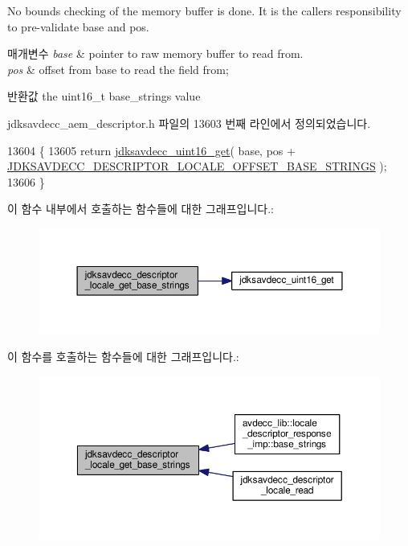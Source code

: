 No bounds checking of the memory buffer is done. It is the caller\textquotesingle{}s responsibility to pre-\/validate base and pos.


\begin{DoxyParams}{매개변수}
{\em base} & pointer to raw memory buffer to read from. \\
\hline
{\em pos} & offset from base to read the field from; \\
\hline
\end{DoxyParams}
\begin{DoxyReturn}{반환값}
the uint16\+\_\+t base\+\_\+strings value 
\end{DoxyReturn}


jdksavdecc\+\_\+aem\+\_\+descriptor.\+h 파일의 13603 번째 라인에서 정의되었습니다.


\begin{DoxyCode}
13604 \{
13605     \textcolor{keywordflow}{return} \hyperlink{group__endian_ga3fbbbc20be954aa61e039872965b0dc9}{jdksavdecc\_uint16\_get}( base, pos + 
      \hyperlink{group__descriptor__locale_ga86d86810d4ea3cb299eec3d9cb6639b0}{JDKSAVDECC\_DESCRIPTOR\_LOCALE\_OFFSET\_BASE\_STRINGS} );
13606 \}
\end{DoxyCode}


이 함수 내부에서 호출하는 함수들에 대한 그래프입니다.\+:
\nopagebreak
\begin{figure}[H]
\begin{center}
\leavevmode
\includegraphics[width=350pt]{group__descriptor__locale_gacf24c87b1d2be33314f3a86687aca010_cgraph}
\end{center}
\end{figure}




이 함수를 호출하는 함수들에 대한 그래프입니다.\+:
\nopagebreak
\begin{figure}[H]
\begin{center}
\leavevmode
\includegraphics[width=350pt]{group__descriptor__locale_gacf24c87b1d2be33314f3a86687aca010_icgraph}
\end{center}
\end{figure}


